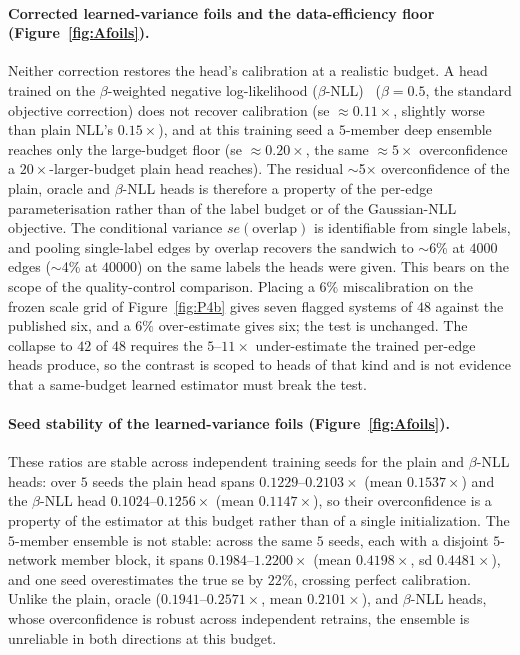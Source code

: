 \paragraph{Corrected learned-variance foils and the data-efficiency floor (Figure~\ref{fig:Afoils}).}
Neither correction restores the head's calibration at a realistic budget. A head trained on the
$\beta$-weighted negative log-likelihood ($\beta$-NLL)~\citep{seitzer2022pitfalls}
($\beta{=}0.5$, the standard objective correction) does not recover calibration (se ${\approx}0.11\times$, slightly worse than plain NLL's
$0.15\times$), and at this training seed a $5$-member deep
ensemble~\citep{lakshminarayanan2017ensembles} reaches only the large-budget floor
(se ${\approx}0.20\times$, the same ${\approx}5\times$ overconfidence a $20\times$-larger-budget
plain head reaches).
The residual $\sim$5$\times$ overconfidence of the plain, oracle and $\beta$-NLL heads is
therefore a property of the per-edge parameterisation rather than of the label budget or of
the Gaussian-NLL objective. The conditional variance $se(\text{overlap})$ is identifiable from
single labels, and pooling single-label edges by overlap recovers the sandwich to $\sim$6\% at
$4000$ edges ($\sim$4\% at $40000$) on the same labels the heads were given. This bears on the
scope of the quality-control comparison. Placing a $6\%$ miscalibration on the frozen
scale grid of Figure~\ref{fig:P4b} gives seven flagged systems of $48$ against the published six, and
a $6\%$ over-estimate gives six; the test is unchanged. The collapse to $42$ of $48$ requires the
$5$--$11\times$ under-estimate the trained per-edge heads produce, so the contrast is scoped to
heads of that kind and is not evidence that a same-budget learned estimator must break the test.

\paragraph{Seed stability of the learned-variance foils (Figure~\ref{fig:Afoils}).}
These ratios are stable across independent training seeds for the plain and
$\beta$-NLL heads: over $5$ seeds the plain head spans $0.1229$--$0.2103\times$ (mean
$0.1537\times$) and the $\beta$-NLL head $0.1024$--$0.1256\times$ (mean $0.1147\times$), so their
overconfidence is a property of the estimator at this budget rather than of a single
initialization. The $5$-member ensemble is not stable: across the same $5$ seeds, each with a
disjoint $5$-network member block, it spans $0.1984$--$1.2200\times$ (mean $0.4198\times$, sd
$0.4481\times$), and one seed overestimates the true se by $22\%$, crossing perfect
calibration. Unlike the plain, oracle ($0.1941$--$0.2571\times$, mean $0.2101\times$), and
$\beta$-NLL heads, whose overconfidence is robust across independent retrains, the ensemble is
unreliable in both directions at this budget.

